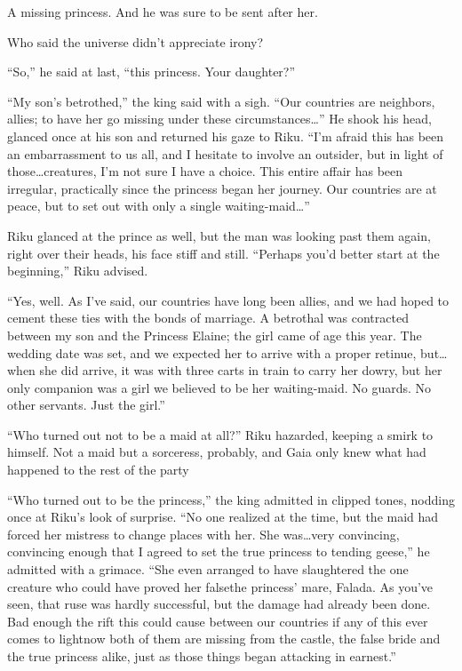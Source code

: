 A missing princess. And he was sure to be sent after her.

Who said the universe didn't appreciate irony?

``So,'' he said at last, ``this princess. Your daughter?''

``My son's betrothed,'' the king said with a sigh. ``Our countries are neighbors, allies; to have her go missing under these circumstances\ldots '' He shook his head, glanced once at his son and returned his gaze to Riku. ``I'm afraid this has been an embarrassment to us all, and I hesitate to involve an outsider, but in light of those\ldots creatures, I'm not sure I have a choice. This entire affair has been irregular, practically since the princess began her journey. Our countries are at peace, but to set out with only a single waiting-maid\ldots ''

Riku glanced at the prince as well, but the man was looking past them again, right over their heads, his face stiff and still. ``Perhaps you'd better start at the beginning,'' Riku advised.

``Yes, well. As I've said, our countries have long been allies, and we had hoped to cement these ties with the bonds of marriage. A betrothal was contracted between my son and the Princess Elaine; the girl came of age this year. The wedding date was set, and we expected her to arrive with a proper retinue, but\ldots when she did arrive, it was with three carts in train to carry her dowry, but her only companion was a girl we believed to be her waiting-maid. No guards. No other servants. Just the girl.''

``Who turned out not to be a maid at all?'' Riku hazarded, keeping a smirk to himself. Not a maid but a sorceress, probably, and Gaia only knew what had happened to the rest of the party\textemdash 

``Who turned out to be the princess,'' the king admitted in clipped tones, nodding once at Riku's look of surprise. ``No one realized at the time, but the maid had forced her mistress to change places with her. She was\ldots very convincing, convincing enough that I agreed to set the true princess to tending geese,'' he admitted with a grimace. ``She even arranged to have slaughtered the one creature who could have proved her false\textemdash the princess' mare, Falada. As you've seen, that ruse was hardly successful, but the damage had already been done. Bad enough the rift this could cause between our countries if any of this ever comes to light\textemdash now both of them are missing from the castle, the false bride and the true princess alike, just as those things began attacking in earnest.''

